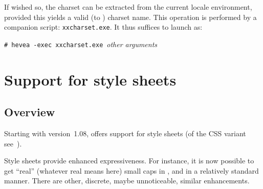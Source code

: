 %
If wished so, the charset can be extracted from the current
locale environment, provided this yields a valid (to \hevea) charset name.
This operation is performed by a companion script: \texttt{xxcharset.exe}.
It thus suffices to launch \hevea{} as:
\begin{flushleft}
\texttt{\# hevea -exec xxcharset.exe}~\textit{other arguments} 
\end{flushleft}

\iffalse
\index{"@charset\texttt{\char92"charset}}%
\index{"@set"@out"@translator@\texttt{\char92"@set"@out"@translator}}%
\hevea{} mechanism for charsets can be extended to other
8~bits encodings. To provide support for encoding \textit{encoding}:
\begin{itemize}
\item Be sure that \textit{encoding} is a valid (to \html) encoding
name.
\item Create a file \textit{encoding}\texttt{.map}, that contains
the definition of the encoding --- see Section~\ref{newmap} for details.
\item Issue the following commands:
\begin{flushleft}
\verb+\def\@charset{+\textit{encoding}\verb+}+\\
\verb+\@set@out@translator{+\textit{encoding}\verb+}+
\end{flushleft}
\item Send me \textit{encoding}\texttt{.map} file.
I will include it in the \texttt{mappings} directory.
As a result, \verb+\@def@charset{+\texttt{encoding}\verb+}+ will work.
\end{itemize}
\fi

\section{Support\label{style:sheets} for style sheets}

\subsection{Overview}
Starting with version~1.08, \hevea{} offers support for style sheets
(of the CSS variant see~\cite{css}).

Style sheets provide enhanced expressiveness. For instance, it is now possible
to get ``real'' (whatever real means here) small caps in {\html}, and in a
relatively standard manner. There are other, discrete, maybe
unnoticeable, similar enhancements.

